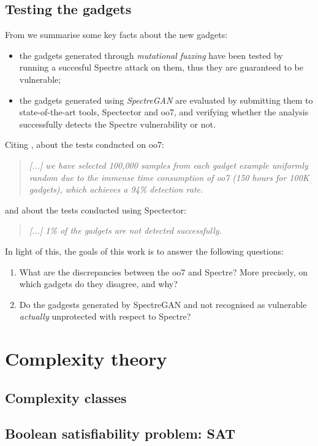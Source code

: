 \documentclass[12pt,a4paper]{book}
\theoremstyle{definition}
\begin{document}
	\section{Testing the gadgets}
	From \cite{Tol2021} we summarise some key facts about the new gadgets:
	\begin{itemize}
		\item the gadgets generated through \textit{mutational fuzzing} have been tested by running a succesful Spectre attack on them, thus they are guaranteed to be vulnerable;
		\item the gadgets generated using \textit{SpectreGAN} are evaluated by submitting them to state-of-the-art tools, Spectector and oo7, and verifying whether the analysis successfully detects the Spectre vulnerability or not.
	\end{itemize}
	Citing \cite{Tol2021}, about the tests conducted on oo7:
	\begin{quote}
		\textit{[...] we have selected 100,000 samples from each gadget example uniformly random due to the immense time consumption of oo7 (150 hours for 100K gadgets), which achieves a 94\% detection rate.}
	\end{quote}
	and about the tests conducted using Spectector:
	\begin{quote}
		\textit{[...] 1\% of the gadgets are not detected successfully.}
	\end{quote}
	In light of this, the goals of this work is to answer the following questions: 
	\begin{enumerate}
		\item What are the discrepancies between the oo7 and Spectre? More precisely, on which gadgets do they disagree, and why? 
		\item Do the gadgests generated by SpectreGAN and not recognised as vulnerable \textit{actually} unprotected with respect to Spectre?
	\end{enumerate}
	
	\appendix
	\chapter{Complexity theory}\label{appendix:complexity}
	\section{Complexity classes}
	\section{Boolean satisfiability problem: SAT}
\end{document}
